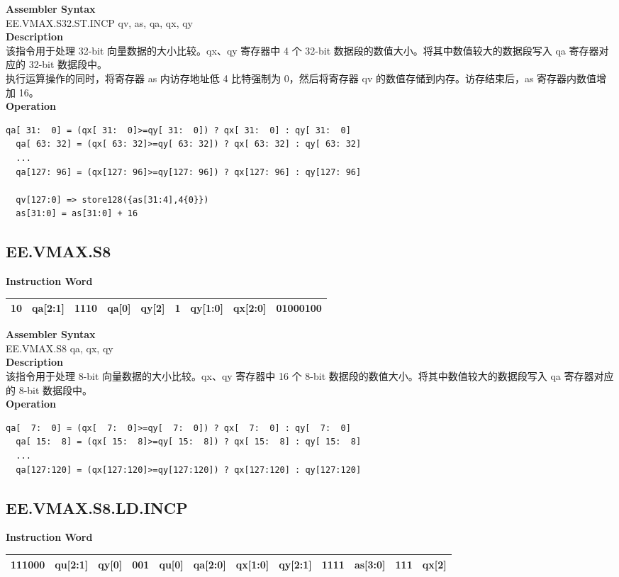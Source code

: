 \textbf{Assembler Syntax} \\
EE.VMAX.S32.ST.INCP qv, as, qa, qx, qy \\
\textbf{Description} \\
该指令用于处理 32-bit 向量数据的大小比较。qx、qy 寄存器中 4 个 32-bit 数据段的数值大小。将其中数值较大的数据段写入 qa 寄存器对应的 32-bit 数据段中。\\
执行运算操作的同时，将寄存器 as 内访存地址低 4 比特强制为 0，然后将寄存器 qv 的数值存储到内存。访存结束后，as 寄存器内数值增加 16。\\
\textbf{Operation}
\begin{lstlisting}[escapeinside=`?]
  qa[ 31:  0] = (qx[ 31:  0]>=qy[ 31:  0]) ? qx[ 31:  0] : qy[ 31:  0]
  qa[ 63: 32] = (qx[ 63: 32]>=qy[ 63: 32]) ? qx[ 63: 32] : qy[ 63: 32]
  ...
  qa[127: 96] = (qx[127: 96]>=qy[127: 96]) ? qx[127: 96] : qy[127: 96]

  qv[127:0] => store128({as[31:4],4{0}})
  as[31:0] = as[31:0] + 16
\end{lstlisting}

\clearpage
\subsection{EE.VMAX.S8}\label{instruction:EEVMAXS8}
\setlength\tabcolsep{6pt}
\textbf{Instruction Word} \\
\begin{tabular}{|c|c|c|c|c|c|c|c|c|}
	\hline
	10 & qa[2:1] & 1110 & qa[0] & qy[2] & 1 & qy[1:0] & qx[2:0] & 01000100 \\
	\hline
\end{tabular}

\textbf{Assembler Syntax} \\
EE.VMAX.S8 qa, qx, qy \\
\textbf{Description} \\
该指令用于处理 8-bit 向量数据的大小比较。qx、qy 寄存器中 16 个 8-bit 数据段的数值大小。将其中数值较大的数据段写入 qa 寄存器对应的 8-bit 数据段中。\\
\textbf{Operation}
\begin{lstlisting}[escapeinside=`?]
  qa[  7:  0] = (qx[  7:  0]>=qy[  7:  0]) ? qx[  7:  0] : qy[  7:  0]
  qa[ 15:  8] = (qx[ 15:  8]>=qy[ 15:  8]) ? qx[ 15:  8] : qy[ 15:  8]
  ...
  qa[127:120] = (qx[127:120]>=qy[127:120]) ? qx[127:120] : qy[127:120]
\end{lstlisting}

\clearpage
\subsection{EE.VMAX.S8.LD.INCP}\label{instruction:EEVMAXS8LDINCP}
\setlength\tabcolsep{6pt}
\textbf{Instruction Word} \\
\begin{tabular}{|c|c|c|c|c|c|c|c|c|c|c|c|}
	\hline
	111000 & qu[2:1] & qy[0] & 001 & qu[0] & qa[2:0] & qx[1:0] & qy[2:1] & 1111 & as[3:0] & 111 & qx[2] \\
	\hline
\end{tabular}

